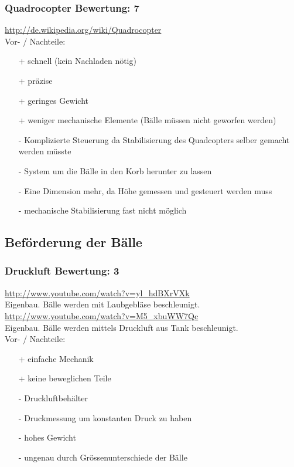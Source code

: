 \subsubsection{Quadrocopter \hfill Bewertung: 7}
\url{http://de.wikipedia.org/wiki/Quadrocopter} \\
Vor- / Nachteile:
\begin{itemize}
    \item[+] schnell (kein Nachladen nötig)
    \item[+] präzise
    \item[+] geringes Gewicht
    \item[+] weniger mechanische Elemente (Bälle müssen nicht geworfen werden)
    \item[-] Komplizierte Steuerung da Stabilisierung des Quadcopters selber 
        gemacht werden müsste
    \item[-] System um die Bälle in den Korb herunter zu lassen
    \item[-] Eine Dimension mehr, da Höhe gemessen und gesteuert werden muss
    \item[-] mechanische Stabilisierung fast nicht möglich
\end{itemize}

\subsection{Beförderung der Bälle}

\subsubsection{Druckluft \hfill Bewertung: 3}
\url{http://www.youtube.com/watch?v=yl_hdBXrVXk} \\
Eigenbau. Bälle werden mit Laubgebläse beschleunigt. \\
\url{http://www.youtube.com/watch?v=M5_xbuWW7Qc} \\
Eigenbau. Bälle werden mittels Druckluft aus Tank beschleunigt. \\
Vor- / Nachteile:
\begin{itemize}
    \item[+] einfache Mechanik
    \item[+] keine beweglichen Teile
    \item[-] Druckluftbehälter
    \item[-] Druckmessung um konstanten Druck zu haben
    \item[-] hohes Gewicht
    \item[-] ungenau durch Grössenunterschiede der Bälle
\end{itemize}

